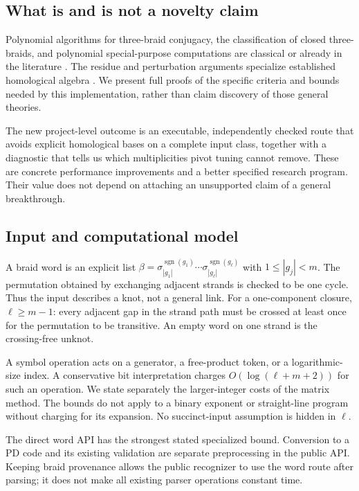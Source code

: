 \documentclass[11pt,letterpaper]{article}
\theoremstyle{definition}
\newcommand{\code}[1]{\texttt{\detokenize{#1}}}
\begin{document}
\subsection{What is and is not a novelty claim}

Polynomial algorithms for three-braid conjugacy, the classification of
closed three-braids, and polynomial special-purpose computations are
classical or already in the literature
\cite{birmanmenasco,datta2020,datta2022,kelomaki2026}.
The residue and perturbation arguments specialize established homological
algebra \cite{khovanovtangles,crainic}.
We present full proofs of the specific criteria and bounds needed by this
implementation, rather than claim discovery of those general theories.

The new project-level outcome is an executable, independently checked route
that avoids explicit homological bases on a complete input class, together
with a diagnostic that tells us which multiplicities pivot tuning cannot
remove. These are concrete performance improvements and a better specified
research program. Their value does not depend on attaching an unsupported
claim of a general breakthrough.

\subsection{Input and computational model}

A braid word is an explicit list
\(\beta=\sigma_{|g_1|}^{\operatorname{sgn}(g_1)}
\cdots\sigma_{|g_\ell|}^{\operatorname{sgn}(g_\ell)}\)
with \(1\le |g_j|<m\).
The permutation obtained by exchanging adjacent strands is checked to be
one cycle. Thus the input describes a knot, not a general link.
For a one-component closure, \(\ell\ge m-1\): every adjacent gap in the
strand path must be crossed at least once for the permutation to be
transitive. An empty word on one strand is the crossing-free unknot.

A symbol operation acts on a generator, a free-product token, or a
logarithmic-size index. A conservative bit interpretation charges
\(O(\log(\ell+m+2))\) for such an operation. We state separately the
larger-integer costs of the matrix method. The bounds do not apply to a
binary exponent or straight-line program without charging for its
expansion. No succinct-input assumption is hidden in \(\ell\).

The direct word API has the strongest stated specialized bound. Conversion
to a PD code and its existing validation are separate preprocessing in the
public \code{Diagram} API. Keeping braid provenance allows the public
recognizer to use the word route after parsing; it does not make all
existing parser operations constant time.
\end{document}

